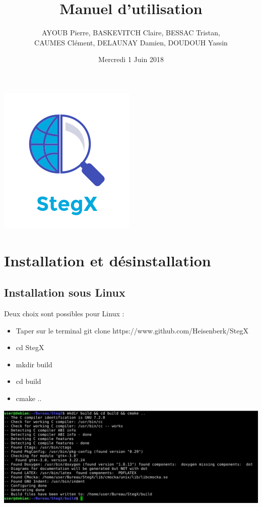 \documentclass[11pt]{article}
\title{\huge{\textbf Manuel d'utilisation}}
\author{AYOUB Pierre, BASKEVITCH Claire, BESSAC Tristan, \\
CAUMES Clément, DELAUNAY Damien, DOUDOUH Yassin}
\date{Mercredi 1 Juin 2018}
\begin{document}
\maketitle
\vspace{20em}
\begin{center}\includegraphics{pictures/Application.png}\end{center}
\newpage

\tableofcontents

\newpage

\section{Installation et désinstallation}

\subsection{Installation sous Linux}

Deux choix sont possibles pour Linux :

\begin{itemize}
\item Taper sur le terminal git clone https://www.github.com/Heisenberk/StegX
\item cd StegX
\item mkdir build 
\item cd build
\item cmake ..
\end{itemize}

\hspace{1cm}
\includegraphics[scale=0.5]{pictures/build.png}
\vspace{0.5cm}
\end{document}
